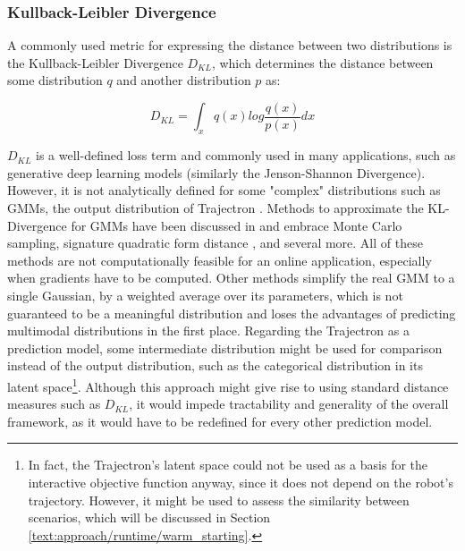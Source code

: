 \subsubsection{Kullback-Leibler Divergence}
A commonly used metric for expressing the distance between two distributions is the Kullback-Leibler Divergence $D_{KL}$, which determines the distance between  some distribution $q$ and another distribution $p$ as:

\begin{equation}
D_{KL} = \int_x q(x) log \frac{q(x)}{p(x)} dx    
\end{equation}

$D_{KL}$ is a well-defined loss term and commonly used in many applications, such as generative deep learning models \cite{Goodfellow2014}\cite{Salzmann2020} (similarly the Jenson-Shannon Divergence). However, it is not analytically defined for some "complex" distributions such as \ac{GMM}s, the output distribution of Trajectron \cite{Ivanovic2018}. Methods to approximate the KL-Divergence for \ac{GMM}s have been discussed in \cite{Cui2015} and embrace Monte Carlo sampling, signature quadratic form distance \cite{Beecks2011}, and several more. All of these methods are not computationally feasible for an online application, especially when gradients have to be computed. Other methods simplify the real \ac{GMM} to a single Gaussian, by a weighted average over its parameters, which is not guaranteed to be a meaningful distribution and loses the advantages of predicting multimodal distributions in the first place.
\newline
Regarding the Trajectron \cite{Ivanovic2018} as a prediction model, some intermediate distribution might be used for comparison instead of the output distribution, such as the categorical distribution in its latent space\footnote{In fact, the Trajectron's latent space could not be used as a basis for the interactive objective function anyway, since it does not depend on the robot's trajectory. However, it might be used to assess the similarity between scenarios, which will be discussed in Section \ref{text:approach/runtime/warm_starting}.}. Although this approach might give rise to using standard distance measures such as $D_{KL}$, it would impede tractability and generality of the overall framework, as it would have to be redefined for every other prediction model.

